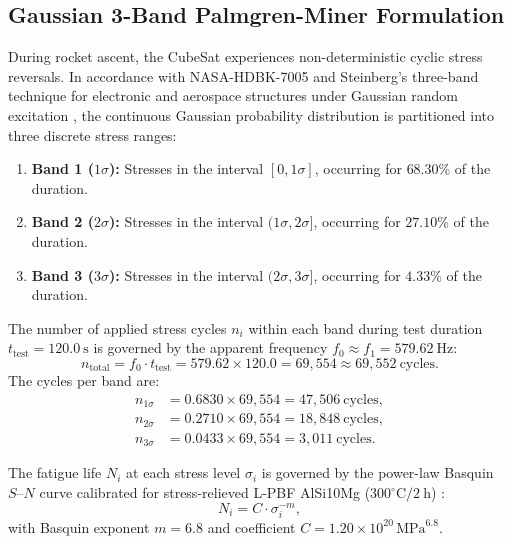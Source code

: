 \subsection{Gaussian 3-Band Palmgren-Miner Formulation}

During rocket ascent, the CubeSat experiences non-deterministic cyclic stress reversals. In accordance with NASA-HDBK-7005 \cite{nasa2001} and Steinberg's three-band technique for electronic and aerospace structures under Gaussian random excitation \cite{steinberg2000}, the continuous Gaussian probability distribution is partitioned into three discrete stress ranges:
\begin{enumerate}
\item \textbf{Band 1 ($1\sigma$):} Stresses in the interval $[0, 1\sigma]$, occurring for $68.30\%$ of the duration.
\item \textbf{Band 2 ($2\sigma$):} Stresses in the interval $(1\sigma, 2\sigma]$, occurring for $27.10\%$ of the duration.
\item \textbf{Band 3 ($3\sigma$):} Stresses in the interval $(2\sigma, 3\sigma]$, occurring for $4.33\%$ of the duration.
\end{enumerate}

The number of applied stress cycles $n_i$ within each band during test duration $t_{\text{test}} = \SI{120.0}{\second}$ is governed by the apparent frequency $f_0 \approx f_1 = \SI{579.62}{\hertz}$:
\begin{equation}
n_{\text{total}} = f_0 \cdot t_{\text{test}} = 579.62 \times 120.0 = 69{,}554 \approx 69{,}552\ \text{cycles}.
\label{eq:ch6_total_cycles}
\end{equation}
The cycles per band are:
\begin{align}
n_{1\sigma} &= 0.6830 \times 69{,}554 = 47{,}506\ \text{cycles}, \\
n_{2\sigma} &= 0.2710 \times 69{,}554 = 18{,}848\ \text{cycles}, \\
n_{3\sigma} &= 0.0433 \times 69{,}554 = 3{,}011\ \text{cycles}.
\end{align}

The fatigue life $N_i$ at each stress level $\sigma_i$ is governed by the power-law Basquin $S\text{--}N$ curve calibrated for stress-relieved L-PBF AlSi10Mg ($300^\circ\text{C} / \SI{2}{\hour}$) \cite{collini2024}:
\begin{equation}
N_i = C \cdot \sigma_i^{-m},
\label{eq:basquin_sn}
\end{equation}
with Basquin exponent $m = 6.8$ and coefficient $C = 1.20 \times 10^{20}\,\text{MPa}^{6.8}$.

